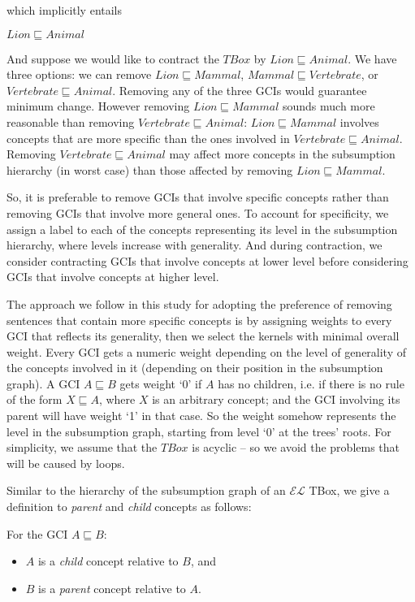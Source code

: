which implicitly entails
\begin{center}
$Lion \sqsubseteq Animal$
\end{center}
And suppose we would like to contract the $TBox$ by $Lion \sqsubseteq Animal$. We have three options: we can remove $Lion \sqsubseteq Mammal$, $Mammal \sqsubseteq Vertebrate$, or $Vertebrate \sqsubseteq Animal$. Removing any of the three GCIs would guarantee minimum change. However removing $Lion \sqsubseteq Mammal$ sounds much more reasonable than removing $Vertebrate \sqsubseteq Animal$: $Lion \sqsubseteq Mammal$ involves concepts that are more specific than the ones involved in $Vertebrate \sqsubseteq Animal$. Removing $Vertebrate \sqsubseteq Animal$ may affect more concepts in the subsumption hierarchy (in worst case) than those affected by removing $Lion \sqsubseteq Mammal$. 

So, it is preferable to remove GCIs that involve specific concepts rather than removing GCIs that involve more general ones. To account for specificity, we assign a label to each of the concepts representing its level in the subsumption hierarchy, where levels increase with generality. And during contraction, we consider contracting GCIs that involve concepts at lower level before considering GCIs that involve concepts at higher level.

The approach we follow in this study for adopting the preference of removing sentences that contain more specific concepts is by assigning weights to every GCI that reflects its generality, then we select the kernels with minimal overall weight. Every GCI gets a numeric weight depending on the level of generality of the concepts involved in it (depending on their position in the subsumption graph). A GCI $A \sqsubseteq B$ gets weight `0' if $A$ has no children, i.e. if there is no rule of the form $X \sqsubseteq A$, where $X$ is an arbitrary concept; and the GCI involving its parent will have weight `1' in that case. So the weight somehow represents the level in the subsumption graph, starting from level `0' at the trees' roots. For simplicity, we assume that the $TBox$ is acyclic -- so we avoid the problems that will be caused by loops.


Similar to the hierarchy of the subsumption graph of an $\mathcal{EL}$ TBox, we give a definition to \textit{parent} and \textit{child} concepts as follows:
\begin{defn}
\label{defn:Parent-Child}
For the GCI $A \sqsubseteq B$:
\begin{itemize}
\item $A$ is a \textit{child} concept relative to $B$, and
\item $B$ is a \textit{parent} concept relative to $A$.\\
\end{itemize}
\end{defn}

